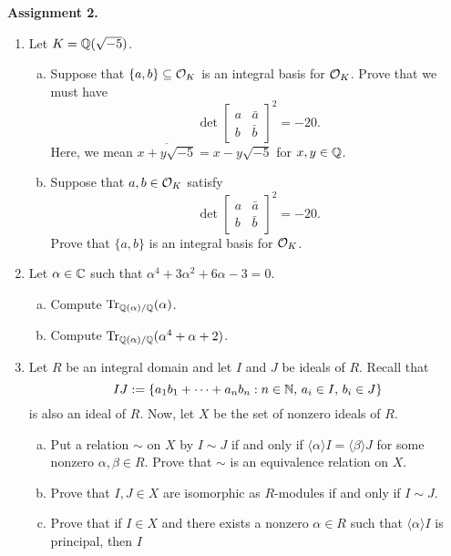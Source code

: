 {\bf Assignment 2.} 
\begin{enumerate}[leftmargin=1.5cm, label={{\bf A2-\arabic*}}]
    \item \label{A2-1} Let $K = \mathbb{Q}(\sqrt{-5})$. \begin{enumerate}[(a)]
        \item Suppose that $\{a, b\} \subseteq {\cal O}_K$ is an integral basis 
        for ${\cal O}_K$. Prove that we must have 
        \[ \det \begin{bmatrix} a & \bar{a} \\ b & \bar{b} \end{bmatrix}^2 = -20. \]
        Here, we mean $\overline{x + y\sqrt{-5}} = x - y\sqrt{-5}$ for $x, y \in \mathbb{Q}$. 
        \item Suppose that $a, b \in {\cal O}_K$ satisfy 
        \[ \det \begin{bmatrix} a & \bar{a} \\ b & \bar{b} \end{bmatrix}^2 = -20. \] 
        Prove that $\{a, b\}$ is an integral basis for ${\cal O}_K$.  
    \end{enumerate} 
    \item \label{A2-2} Let $\alpha \in \mathbb{C}$ such that $\alpha^4 + 3\alpha^2 + 
    6\alpha - 3 = 0$. \begin{enumerate}[(a)]
        \item Compute $\operatorname{Tr}_{\mathbb{Q}(\alpha)/\mathbb{Q}}(\alpha)$. 
        \item Compute $\operatorname{Tr}_{\mathbb{Q}(\alpha)/\mathbb{Q}}(\alpha^4 + \alpha + 2)$.
    \end{enumerate}
    \item \label{A2-3} Let $R$ be an integral domain and let $I$ and $J$ be 
    ideals of $R$. Recall that 
    \[ IJ := \{a_1b_1 + \cdots + a_nb_n : n \in \mathbb{N},\, a_i \in I,\, b_i \in J\} \] 
    is also an ideal of $R$. Now, let $X$ be the set of nonzero ideals of $R$. 
    \begin{enumerate}[(a)]
        \item Put a relation $\sim$ on $X$ by $I \sim J$ if and only if 
        $\langle \alpha \rangle I = \langle \beta \rangle J$ for some 
        nonzero $\alpha, \beta \in R$. Prove that $\sim$ is an equivalence 
        relation on $X$. 
        \item Prove that $I, J \in X$ are isomorphic as $R$-modules if and only if 
        $I \sim J$. 
        \item Prove that if $I \in X$ and there exists a nonzero $\alpha \in R$ 
        such that $\langle \alpha \rangle I$ is principal, then $I$ 

\end{enumerate}
\end{enumerate}
